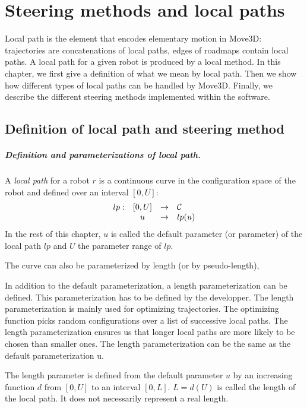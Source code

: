 \def\hsp{\hspace*{1cm}}

\chapter{Steering methods and local paths}
\label{methode-local}
\def\CS{{\cal C}}

Local path is the element that encodes elementary motion in Move3D:
trajectories are concatenations of local paths, edges of roadmaps
contain local paths. A local path for a given robot is produced by a
local method. In this chapter, we first give a definition of what we
mean by local path. Then we show how different types of local paths
can be handled by Move3D. Finally, we describe the different steering
methods implemented within the software.

\section{Definition of local path and steering method}

\paragraph{Definition and parameterizations of local path.}
A {\em local path} for a robot $r$ is a continuous curve in the
configuration space of the robot and defined over an interval $[0,U]$:
$$
\begin{array}{lcll}
lp: & [0,U] & \rightarrow & \CS \\
    & u &\rightarrow & lp(u)
\end{array}
$$
In the rest of this chapter, $u$ is called the default parameter (or
parameter) of the local path $lp$ and $U$ the parameter range of $lp$.

 The curve can also be parameterized by length (or
  by pseudo-length), 

In addition to the default parameterization, a length parameterization
can be defined. This parameterization has to be defined by the
developper.  The length parameterization is mainly used for optimizing
trajectories.  The optimizing function picks random configurations
over a list of successive local paths. The length parameterization
ensures us that longer local paths are more likely to be chosen than
smaller ones. The length parameterization can be the same as the
default parameterization u.

The length parameter is defined from the default parameter $u$ by an
increasing function $d$ from $[0,U]$ to an interval $[0,L]$. $L=d(U)$
is called the length of the local path. It does not necessarily represent 
a real length. 

